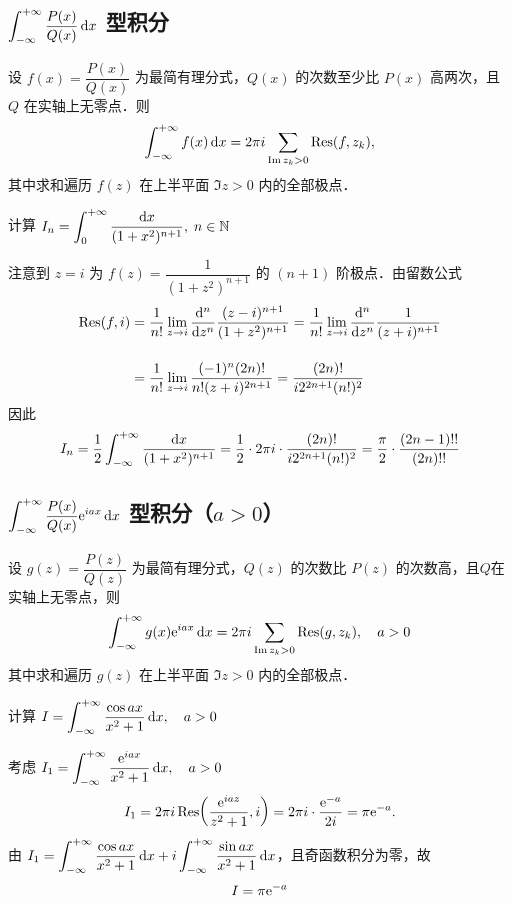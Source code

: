 \documentclass[12pt, a4paper, oneside, UTF8]{ctexbook}
\begin{document}
\subsection{$\displaystyle\int_{-\infty}^{+\infty} \frac{P(x)}{Q(x)}\,\mathrm{d} x$ 型积分}

\begin{theorem}[有理函数的无穷积分]
设 $f(x) = \dfrac{P(x)}{Q(x)}$ 为最简有理分式，$Q(x)$ 的次数至少比 $P(x)$ 高两次，且 $Q$ 在实轴上无零点．则
\[
\int_{-\infty}^{+\infty} f(x)\,\d x = 2\pi i\sum_{\Im z_k>0}\Res(f,z_k),
\]
其中求和遍历 $f(z)$ 在上半平面 $\Im z>0$ 内的全部极点．
\end{theorem}

\begin{example}
    计算 $\displaystyle I_n = \int_{0}^{+\infty}\frac{\mathrm{d} x}{(1+x^2)^{n+1}},\; n \in \mathbb{N}$
\end{example}
\begin{solution}
    注意到 $z=i$ 为 $f(z)=\dfrac{1}{(1+z^2)^{n+1}}$ 的 $(n+1)$ 阶极点．由留数公式
    \begin{align*}
        \Res(f,i) &= \frac{1}{n!}\lim_{z\to i}\frac{\d^n}{\d z^n}\frac{(z-i)^{n+1}}{(1+z^2)^{n+1}} = \frac{1}{n!}\lim_{z\to i}\frac{\d^n}{\d z^n}\frac{1}{(z+i)^{n+1}}\\[1.2em]
        &= \frac{1}{n!}\lim_{z\to i}\frac{(-1)^n(2n)!}{n!(z+i)^{2n+1}} = \frac{(2n)!}{i2^{2n+1}(n!)^2}
    \end{align*}
    因此
    \[I_n=\frac12\int_{-\infty}^{+\infty}\frac{\mathrm{d} x}{(1+x^2)^{n+1}} = \frac12 \cdot 2\pi i \cdot \frac{(2n)!}{i2^{2n+1}(n!)^2} = \frac{\pi}{2}\cdot\frac{(2n-1)!!}{(2n)!!}\]
\end{solution}

\subsection{$\displaystyle\int_{-\infty}^{+\infty} \frac{P(x)}{Q(x)}\mathrm{e}^{iax}\,\mathrm{d} x$ 型积分（$a>0$）}

\begin{theorem}
设 $g(z) = \dfrac{P(z)}{Q(z)}$ 为最简有理分式，$Q(z)$ 的次数比 $P(z)$ 的次数高，且$Q$在实轴上无零点，则
\[\int_{-\infty}^{+\infty} g(x)\e^{iax}\,\d x = 2\pi i\sum_{\Im z_k>0}\Res(g,z_k),\quad a>0\]
其中求和遍历 $g(z)$ 在上半平面 $\Im z>0$ 内的全部极点．
\end{theorem}

\begin{example}
计算 $\displaystyle I = \int_{-\infty}^{+\infty}\frac{\cos ax}{x^2+1}\,\mathrm{d} x,\quad a>0$
\end{example}
\begin{solution}
考虑 $I_1 = \displaystyle\int_{-\infty}^{+\infty}\frac{\mathrm{e}^{iax}}{x^2+1}\,\mathrm{d} x,\quad a>0$
\[
I_1 = 2\pi i \Res\!\left(\frac{\e^{iaz}}{z^2+1},i\right) = 2\pi i \cdot \frac{\e^{-a}}{2i} = \pi\e^{-a}.
\]
由 $I_1 = \displaystyle\int_{-\infty}^{+\infty}\frac{\cos ax}{x^2+1}\,\mathrm{d} x + i\int_{-\infty}^{+\infty}\frac{\sin ax}{x^2+1}\,\mathrm{d} x$，且奇函数积分为零，故
\[
I = \pi\mathrm{e}^{-a}
\]
\end{solution}
\end{document}
